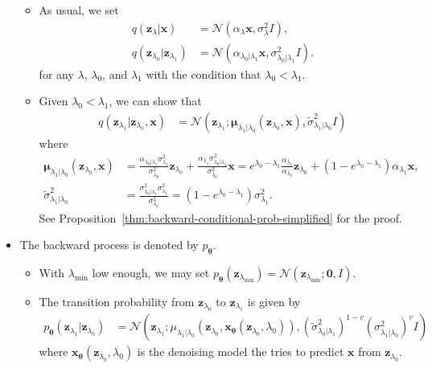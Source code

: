 \documentclass[10pt]{article}
\newcommand{\ve}[1]{\mathbf{#1}}
\newcommand{\ves}[1]{\boldsymbol{#1}}
\newcommand{\N}{\mathcal{N}}
\begin{document}
\begin{itemize}
\begin{itemize}
    \item As usual, we set
    \begin{align*}
      q(\ve{z}_\lambda | \ve{x}) &= \N(\alpha_\lambda \ve{x}, \sigma_\lambda^2 I), \\
      q(\ve{z}_{\lambda_0}|\ve{z}_{\lambda_1}) &= \N(\alpha_{\lambda_0|\lambda_1} \ve{x}, \sigma^2_{\lambda_0|\lambda_1} I).
    \end{align*}
    for any $\lambda$, $\lambda_0$, and $\lambda_1$ with the condition that $\lambda_0 < \lambda_1$.
  
    \item Given $\lambda_0 < \lambda_1$, we can show that
    \begin{align*}
      q(\ve{z}_{\lambda_1} | \ve{z}_{\lambda_0}, \ve{x})
      &= \N(\ve{z}_{\lambda_1}; \ves{\mu}_{\lambda_1|\lambda_0}(\ve{z}_{\lambda_0}, \ve{x}), \widetilde{\sigma}^2_{\lambda_1|\lambda_0}I)
    \end{align*}
    where
    \begin{align*}
      \ves{\mu}_{\lambda_1|\lambda_0}(\ve{z}_{\lambda_0}, \ve{x})
      &= \frac{\alpha_{\lambda_0|\lambda_1} \sigma_{\lambda_1}^2}{\sigma_{\lambda_0}^2} \ve{z}_{\lambda_0} + \frac{\alpha_{\lambda_1} \sigma^2_{\lambda_0|\lambda_1}}{\sigma^2_{\lambda_0}} \ve{x}
      = e^{\lambda_0 - \lambda_1} \frac{\alpha_{\lambda_1}}{\alpha_{\lambda_0}} \ve{z}_{\lambda_0} + (1 - e^{\lambda_0 - \lambda_1})\alpha_{\lambda_1} \ve{x}, \\
      \widetilde{\sigma}^{2}_{\lambda_1 | \lambda_0} 
      &= \frac{ \sigma^2_{\lambda_0|\lambda_1}\sigma^2_{\lambda_1}}{\sigma^2_{\lambda_0}} 
      = (1 - e^{\lambda_0 - \lambda_1})\sigma^2_{\lambda_1}.
    \end{align*}
    See Proposition~\ref{thm:backward-conditional-prob-simplified} for the proof.  
  \end{itemize}

  \item The backward process is denoted by $p_{\ves{\theta}}$.
  \begin{itemize}
    \item With $\lambda_{\min}$ low enough, we may set $p_{\ves{\theta}}(\ve{z}_{\lambda_{\min}}) = \N(\ve{z}_{\lambda_{\min}}; \ve{0}, I).$
    
    \item The transition probability from $\ve{z}_{\lambda_0}$ to $\ve{z}_{\lambda_1}$ is given by
    \begin{align*}
      p_{\ves{\theta}}(\ve{z}_{\lambda_1} | \ve{z}_{\lambda_0})
      &= \N(\ve{z}_{\lambda_1}; \mu_{\lambda_1|\lambda_0}(\ve{z}_{\lambda_0}, \ve{x}_{\ves{\theta}}(\ve{z}_{\lambda_0}, \lambda_0)), (\widetilde{\sigma}^2_{\lambda_0|\lambda_1})^{1-v}(\sigma^2_{\lambda_1|\lambda_0})^v I)
    \end{align*}
    where $\ve{x}_{\ves{\theta}}(\ve{z}_{\lambda_0}, \lambda_0)$ is the denoising model the tries to predict $\ve{x}$ from $\ve{z}_{\lambda_0}$.


\end{itemize}
\end{itemize}
\end{document}
